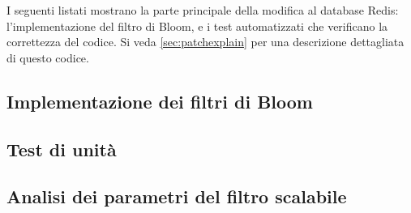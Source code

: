 I seguenti listati mostrano la parte principale della modifica al database Redis:
l'implementazione del filtro di Bloom, e i test automatizzati che verificano la correttezza
del codice. Si veda \ref{sec:patchexplain} per una descrizione dettagliata di questo codice.

\subsection{Implementazione dei filtri di Bloom}

\subsection{Test di unità}

\subsection{Analisi dei parametri del filtro scalabile}
